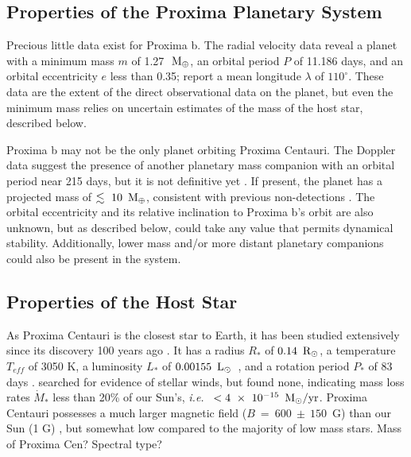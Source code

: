\documentclass[preprint,12pt]{aastex}
\newcommand{\xxx}[1]{{\color{red} #1}} %
\def\mearth{{\rm\,M_\oplus}}
\def\msun{{\rm\,M_\odot}}
\def\rsun{{\rm\,R_\odot}}
\def\lsun{{\rm\,L_\odot}}
\def\ie{{\it i.e.\ }}
\begin{document}
\subsection{Properties of the Proxima Planetary System}
\label{sec:obs:planetsys}
Precious little data exist for Proxima b. The radial velocity data
reveal a planet with a minimum mass $m$ of 1.27~$\mearth$, an orbital period $P$
of 11.186 days, and an orbital eccentricity $e$ less than 0.35;
\cite{AngladaEscude16} report a mean longitude $\lambda$ of $110^\circ$. These
data are the extent of the direct observational data on the planet,
but even the minimum mass relies on uncertain estimates of the mass of
the host star, described below.

Proxima b may not be the only planet orbiting Proxima
Centauri. The Doppler data suggest the presence of another planetary
mass companion with an orbital period near 215 days, but it is not
definitive yet \citep{AngladaEscude16}. If present, the planet has a
projected mass of $\lesssim~10~\mearth$, consistent with previous
non-detections \citep{EndlKurster08,Barnes14,Lurie14}. The orbital
eccentricity and its relative inclination to Proxima b's orbit are also
unknown, but as described below, could take any value that permits
dynamical stability. Additionally, lower mass and/or more distant
planetary companions could also be present in the system.

\subsection{Properties of the Host Star}
\label{sec:obs:star}
As Proxima Centauri is the closest star to Earth, it has been studied
extensively since its discovery 100 years ago \citep{Innes1915}.  It
has a radius $R_*$ of $0.14~\rsun$, a temperature $T_{eff}$ of 3050 K, a
luminosity $L_*$ of $0.00155~\lsun$~\citep{Boyajian12}, and a rotation
period $P_*$ of 83 days \citep{Benedict98}. \cite{Wood01} searched for
evidence of stellar winds, but found none, indicating mass loss rates
$\dot{M}_*$ less than 20\% of our Sun's, \ie
$<4~\times~10^{-15}~\msun/\textrm{yr}$. Proxima Centauri possesses a
much larger magnetic field ($B~=~600~\pm~150$~G) than our Sun (1 G)
\citep{ReinersBasri08}, but somewhat low compared to the majority of
low mass stars. \xxx{Mass of Proxima Cen? Spectral type?}
\end{document}
